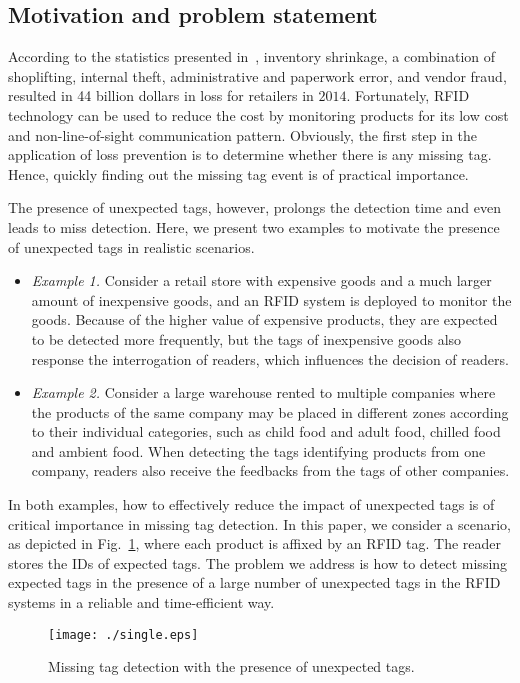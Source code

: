 \documentclass[10pt, twocolumn]{IEEEtran}
\begin{document}
\subsection{Motivation and problem statement}
According to the statistics presented in~\cite{National2015}, inventory shrinkage, a combination of shoplifting, internal theft, administrative and paperwork error, and vendor fraud, resulted in 44 billion dollars in loss for retailers in $2014$.
Fortunately, RFID technology can be used to reduce the cost by monitoring products for its low cost and non-line-of-sight communication pattern.
Obviously, the first step in the application of loss prevention is to determine whether there is any missing tag. Hence, quickly finding out the missing tag event is of practical importance.

The presence of unexpected tags, however, prolongs the detection time and even leads to miss detection.
Here, we present two examples to motivate the presence of unexpected tags in realistic scenarios.
\begin{itemize}
\item \emph{Example 1.} Consider a retail store with expensive goods and a much larger amount of inexpensive goods, and an RFID system is deployed to monitor the goods. Because of the higher value of expensive products, they are expected to be detected more frequently, but the tags of inexpensive goods also response the interrogation of readers, which influences the decision of readers.
\item \emph{Example 2.} Consider a large warehouse rented to multiple companies where the products of the same company may be placed in different zones according to their individual categories, such as child food and adult food, chilled food and ambient food. When detecting the tags identifying products from one company, readers also receive the feedbacks from the tags of other companies.
\end{itemize}

In both examples, how to effectively reduce the impact of unexpected tags is of critical importance in missing tag detection. In this paper, we consider a scenario, as depicted in Fig.~\ref{Fig:single_reader}, where each product is affixed by an RFID tag. The reader stores the IDs of expected tags. The problem we address is how to detect missing expected tags in the presence of a large number of unexpected tags in the RFID systems in a reliable and time-efficient way.

\begin{figure}[htbp]
\vspace{-0cm}
\centering
\texttt{[image: ./single.eps]}
\vspace{-0cm}
\caption{Missing tag detection with the presence of unexpected tags.}
\label{Fig:single_reader}
\end{figure}
\end{document}
